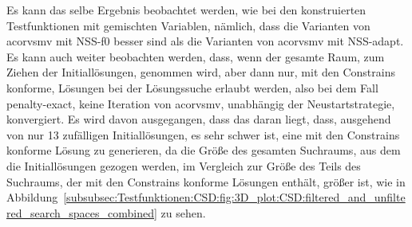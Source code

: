 \documentclass[fontsize=12, a4aper]{scrartcl}
\begin{document}
	Es kann das selbe Ergebnis beobachtet werden, wie bei den konstruierten Testfunktionen mit gemischten Variablen, nämlich, dass die Varianten von \ac{acorvsmv} mit NSS-f0 besser sind als die Varianten von \ac{acorvsmv} mit NSS-adapt. Es kann auch weiter beobachten werden, dass, wenn der gesamte Raum, zum Ziehen der Initiallösungen, genommen wird, aber dann nur, mit den Constrains konforme, Lösungen bei der Lösungssuche erlaubt werden, also bei dem Fall \glqq penalty-exact\grqq, keine Iteration von \ac{acorvsmv}, unabhängig der Neustartstrategie, konvergiert. Es wird davon ausgegangen, dass das daran liegt, dass, ausgehend von nur 13 zufälligen Initiallösungen, es sehr schwer ist, eine mit den Constrains konforme Lösung zu generieren, da die Größe des gesamten Suchraums, aus dem die Initiallösungen gezogen werden, im Vergleich zur Größe des Teils des Suchraums, der mit den Constrains konforme Lösungen enthält, größer ist, wie in Abbildung~\ref{subsubsec:Testfunktionen:CSD:fig:3D_plot:CSD:filtered_and_unfiltered_search_spaces_combined} zu sehen.
	
\end{document}
